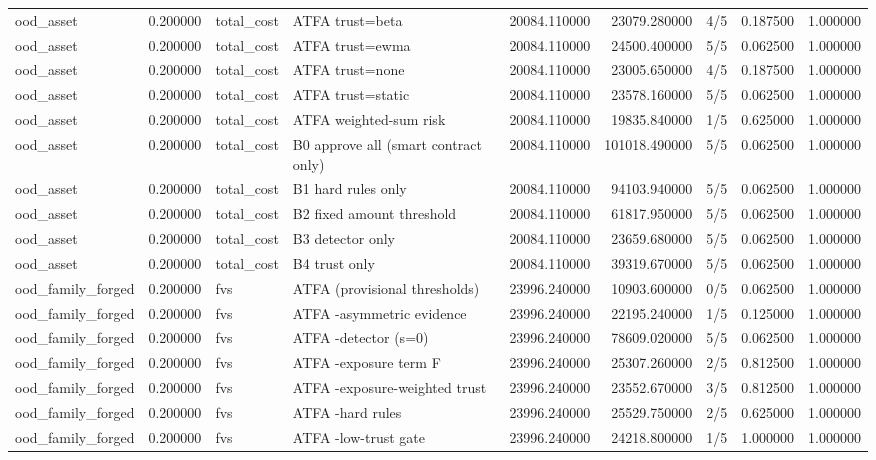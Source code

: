 \begin{tabular}{lrllrrlrr}
ood\_asset & 0.200000 & total\_cost & ATFA trust=beta & 20084.110000 & 23079.280000 & 4/5 & 0.187500 & 1.000000 \\
ood\_asset & 0.200000 & total\_cost & ATFA trust=ewma & 20084.110000 & 24500.400000 & 5/5 & 0.062500 & 1.000000 \\
ood\_asset & 0.200000 & total\_cost & ATFA trust=none & 20084.110000 & 23005.650000 & 4/5 & 0.187500 & 1.000000 \\
ood\_asset & 0.200000 & total\_cost & ATFA trust=static & 20084.110000 & 23578.160000 & 5/5 & 0.062500 & 1.000000 \\
ood\_asset & 0.200000 & total\_cost & ATFA weighted-sum risk & 20084.110000 & 19835.840000 & 1/5 & 0.625000 & 1.000000 \\
ood\_asset & 0.200000 & total\_cost & B0 approve all (smart contract only) & 20084.110000 & 101018.490000 & 5/5 & 0.062500 & 1.000000 \\
ood\_asset & 0.200000 & total\_cost & B1 hard rules only & 20084.110000 & 94103.940000 & 5/5 & 0.062500 & 1.000000 \\
ood\_asset & 0.200000 & total\_cost & B2 fixed amount threshold & 20084.110000 & 61817.950000 & 5/5 & 0.062500 & 1.000000 \\
ood\_asset & 0.200000 & total\_cost & B3 detector only & 20084.110000 & 23659.680000 & 5/5 & 0.062500 & 1.000000 \\
ood\_asset & 0.200000 & total\_cost & B4 trust only & 20084.110000 & 39319.670000 & 5/5 & 0.062500 & 1.000000 \\
ood\_family\_forged & 0.200000 & fvs & ATFA (provisional thresholds) & 23996.240000 & 10903.600000 & 0/5 & 0.062500 & 1.000000 \\
ood\_family\_forged & 0.200000 & fvs & ATFA -asymmetric evidence & 23996.240000 & 22195.240000 & 1/5 & 0.125000 & 1.000000 \\
ood\_family\_forged & 0.200000 & fvs & ATFA -detector (s=0) & 23996.240000 & 78609.020000 & 5/5 & 0.062500 & 1.000000 \\
ood\_family\_forged & 0.200000 & fvs & ATFA -exposure term F & 23996.240000 & 25307.260000 & 2/5 & 0.812500 & 1.000000 \\
ood\_family\_forged & 0.200000 & fvs & ATFA -exposure-weighted trust & 23996.240000 & 23552.670000 & 3/5 & 0.812500 & 1.000000 \\
ood\_family\_forged & 0.200000 & fvs & ATFA -hard rules & 23996.240000 & 25529.750000 & 2/5 & 0.625000 & 1.000000 \\
ood\_family\_forged & 0.200000 & fvs & ATFA -low-trust gate & 23996.240000 & 24218.800000 & 1/5 & 1.000000 & 1.000000 \\

\end{tabular}
